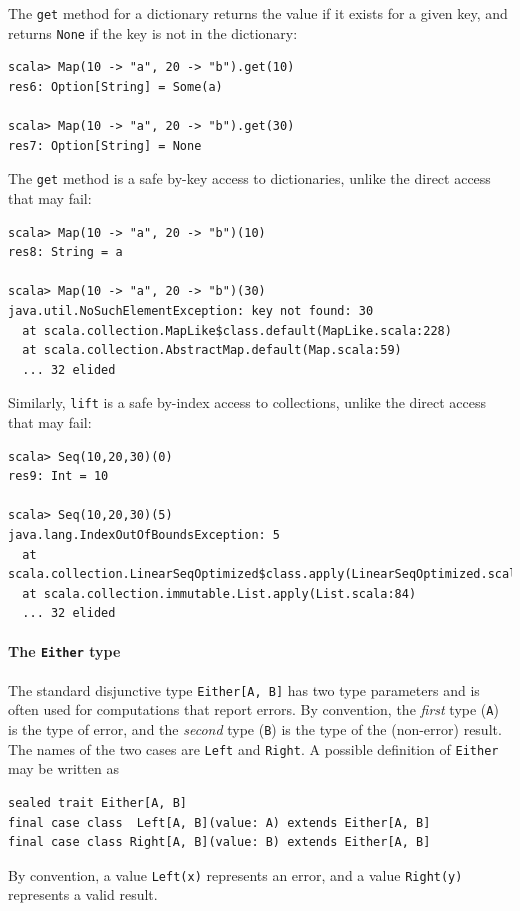 The \lstinline!get! method for a dictionary returns the value if
it exists for a given key, and returns \lstinline!None! if the key
is not in the dictionary:
\begin{lstlisting}
scala> Map(10 -> "a", 20 -> "b").get(10)
res6: Option[String] = Some(a)

scala> Map(10 -> "a", 20 -> "b").get(30)
res7: Option[String] = None 
\end{lstlisting}
The \lstinline!get! method is a safe by-key access to dictionaries,
unlike the direct access that may fail:
\begin{lstlisting}
scala> Map(10 -> "a", 20 -> "b")(10)
res8: String = a 

scala> Map(10 -> "a", 20 -> "b")(30)
java.util.NoSuchElementException: key not found: 30
  at scala.collection.MapLike$class.default(MapLike.scala:228)
  at scala.collection.AbstractMap.default(Map.scala:59)
  ... 32 elided
\end{lstlisting}
Similarly, \lstinline!lift! is a safe by-index access to collections,
unlike the direct access that may fail:
\begin{lstlisting}
scala> Seq(10,20,30)(0)
res9: Int = 10

scala> Seq(10,20,30)(5)
java.lang.IndexOutOfBoundsException: 5
  at scala.collection.LinearSeqOptimized$class.apply(LinearSeqOptimized.scala:65)
  at scala.collection.immutable.List.apply(List.scala:84)
  ... 32 elided
\end{lstlisting}


\paragraph{The \texttt{Either} type}

The standard disjunctive type \lstinline!Either[A, B]! has two type
parameters and is often used for computations that report errors.
By convention, the \emph{first} type (\lstinline!A!) is the type
of error, and the \emph{second} type (\lstinline!B!) is the type
of the (non-error) result. The names of the two cases are \lstinline!Left!
and \lstinline!Right!. A possible definition of \lstinline!Either!
may be written as
\begin{lstlisting}
sealed trait Either[A, B]
final case class  Left[A, B](value: A) extends Either[A, B]
final case class Right[A, B](value: B) extends Either[A, B]
\end{lstlisting}
By convention, a value \lstinline!Left(x)! represents an error, and
a value \lstinline!Right(y)! represents a valid result.


